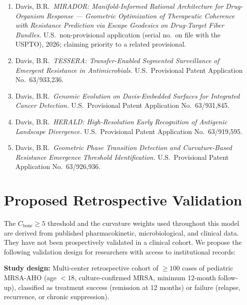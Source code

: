 \documentclass[11pt]{article}
\begin{document}
\begin{enumerate}[leftmargin=1.6em, itemsep=2pt]
  \item Davis, B.R.\ \textit{MIRADOR: Manifold-Informed Rational Architecture for
        Drug-Organism Response — Geometric Optimization of Therapeutic Coherence
        with Resistance Prediction via Escape Geodesics on Drug-Target Fiber
        Bundles.} U.S.\ non-provisional application (serial no.\ on file with the
        USPTO), 2026; claiming priority to a related provisional.

  \item Davis, B.R.\ \textit{TESSERA: Transfer-Enabled Segmented Surveillance of
        Emergent Resistance in Antimicrobials.}
        U.S.\ Provisional Patent Application No.~63/933,236.

  \item Davis, B.R.\ \textit{Genomic Evolution on Davis-Embedded Surfaces for
        Integrated Cancer Detection.}
        U.S.\ Provisional Patent Application No.~63/931,845.

  \item Davis, B.R.\ \textit{HERALD: High-Resolution Early Recognition of
        Antigenic Landscape Divergence.}
        U.S.\ Provisional Patent Application No.~63/919,595.

  \item Davis, B.R.\ \textit{Geometric Phase Transition Detection and
        Curvature-Based Resistance Emergence Threshold Identification.}
        U.S.\ Provisional Patent Application No.~63/926,936.
\end{enumerate}

\section{Proposed Retrospective Validation}\label{sec:validation}

The $C_{\text{bone}} \geq 5$ threshold and the curvature weights used throughout
this model are derived from published pharmacokinetic, microbiological, and
clinical data. They have not been prospectively validated in a clinical cohort.
We propose the following validation design for researchers with access to
institutional records:

\textbf{Study design:} Multi-center retrospective cohort of $\geq 100$ cases of
pediatric MRSA-AHO (age $< 18$, culture-confirmed MRSA, minimum 12-month
follow-up), classified as treatment success (remission at 12 months) or failure
(relapse, recurrence, or chronic suppression).
\end{document}
